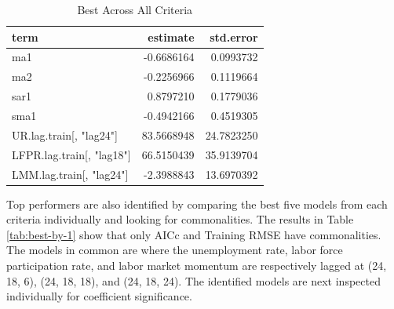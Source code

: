 \documentclass[12pt,letterpaper,toc=flat,oneside]{report}
\theoremstyle{definition}
\theoremstyle{definition}
\theoremstyle{definition}
\theoremstyle{remark}
\begin{document}
\begin{table}[!h]

\caption{\label{tab:best-by-all-1}Best Across All Criteria}
\centering
\begin{tabular}[t]{lrr}
\toprule
\bfseries{term} & \bfseries{estimate} & \bfseries{std.error}\\
\midrule
ma1 & -0.6686164 & 0.0993732\\
ma2 & -0.2256966 & 0.1119664\\
sar1 & 0.8797210 & 0.1779036\\
sma1 & -0.4942166 & 0.4519305\\
UR.lag.train[, "lag24"] & 83.5668948 & 24.7823250\\
\addlinespace
LFPR.lag.train[, "lag18"] & 66.5150439 & 35.9139704\\
LMM.lag.train[, "lag24"] & -2.3988843 & 13.6970392\\
\bottomrule
\end{tabular}
\end{table}

Top performers are also identified by comparing the best five models
from each criteria individually and looking for commonalities. The
results in Table \ref{tab:best-by-1} show that only AICc and Training
RMSE have commonalities. The models in common are where the unemployment
rate, labor force participation rate, and labor market momentum are
respectively lagged at (24, 18, 6), (24, 18, 18), and (24, 18, 24). The
identified models are next inspected individually for coefficient
significance.
\end{document}
